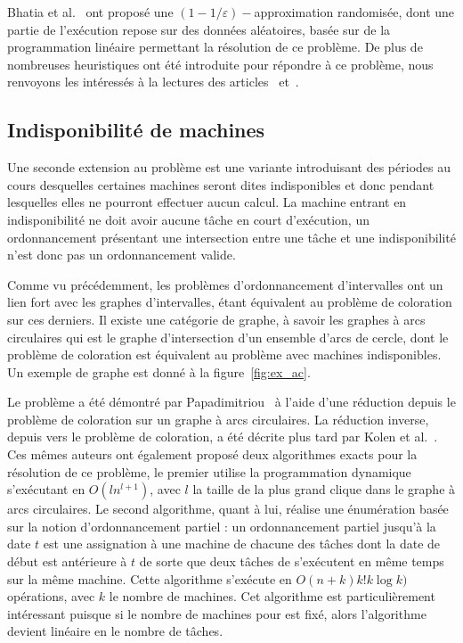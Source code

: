 \documentclass[a4paper,11pt]{report}
\begin{document}
Bhatia et al.~\cite{bhatia2003algorithmic} ont proposé une $(1 - 1/\varepsilon)-$approximation
randomisée, dont une partie de l'exécution repose sur des données aléatoires, basée sur de la
programmation linéaire permettant la résolution de ce problème. De plus de nombreuses heuristiques
ont été introduite pour répondre à ce problème, nous renvoyons les intéressés à la lectures des
articles~\cite{kroon1995exact} et~\cite{gabrel1995scheduling}.

\subsection{Indisponibilité de machines}

Une seconde extension au problème \bisched{} est une variante introduisant des périodes au cours
desquelles certaines machines seront dites indisponibles et donc pendant lesquelles elles ne
pourront effectuer aucun calcul. La machine entrant en indisponibilité ne doit avoir aucune tâche en
court d'exécution, un ordonnancement présentant une intersection entre une tâche et une
indisponibilité n'est donc pas un ordonnancement valide.

Comme vu précédemment, les problèmes d'ordonnancement d'intervalles ont un lien fort avec les
graphes d'intervalles, \bisched{} étant équivalent au problème de coloration sur ces derniers. Il
existe une catégorie de graphe, à savoir les graphes à arcs circulaires qui est le
graphe d'intersection d'un ensemble d'arcs de cercle, dont le problème de coloration est équivalent
au problème avec machines indisponibles. Un exemple de graphe est donné à la figure~\ref{fig:ex_ac}.

Le problème \isma a été démontré \npc par
Papadimitriou~\cite{papadimitriou1982private} à l'aide d'une réduction depuis le problème de
coloration sur un graphe à arcs circulaires. La réduction inverse, depuis \isma vers le problème de
coloration, a été décrite plus tard par Kolen et al.~\cite{kolen2007interval}. Ces mêmes auteurs ont également
proposé deux algorithmes exacts pour la résolution de ce problème, le premier utilise la
programmation dynamique s'exécutant en $O(ln^{l+1})$, avec $l$ la taille de la plus grand clique dans
le graphe à arcs circulaires. Le second algorithme, quant à lui, réalise une énumération  basée sur
la notion d'ordonnancement partiel : un ordonnancement partiel jusqu'à la date $t$ est une
assignation à une machine de chacune des tâches dont la date de début est antérieure à $t$ de sorte
que deux tâches de s'exécutent en même temps sur la même machine. Cette algorithme s'exécute en
$O\left( n+k \right)k!k \log k)$ opérations, avec $k$ le nombre de machines. Cet algorithme est
particulièrement intéressant puisque si le nombre de machines pour \isma est fixé, alors l'algorithme
devient linéaire en le nombre de tâches.
\end{document}
